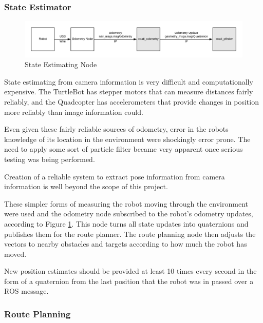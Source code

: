 \documentclass{article}[12]
\begin{document}
	\subsubsection{State Estimator}
	
	\begin{figure}[H]
		\centering
		\includegraphics[width=0.9\linewidth]{OdometryDigram.png}
		\caption{State Estimating Node}
		\label{fig:state}
	\end{figure}

	State estimating from camera information is very difficult and computationally expensive. The TurtleBot has stepper motors that can measure distances fairly reliably, and the Quadcopter has accelerometers that provide changes in position more reliably than image information could. 
	
	Even given these fairly reliable sources of odometry, error in the robots knowledge of its location in the environment were shockingly error prone. The need to apply some sort of particle filter became very apparent once serious testing was being performed.
	
	Creation of a reliable system to extract pose information from camera information is well beyond the scope of this project.
	
	These simpler forms of measuring the robot moving through the environment were used and the odometry node subscribed to the robot's odometry updates, according to Figure \ref{fig:state}. This node turns all state updates into quaternions and publishes them for the route planner. The route planning node then adjusts the vectors to nearby obstacles and targets according to how much the robot has moved. 
	
	New position estimates should be provided at least 10 times every second in the form of a quaternion from the last position that the robot was in passed over a ROS message.
	

	\subsubsection{Route Planning}
	
\end{document}
